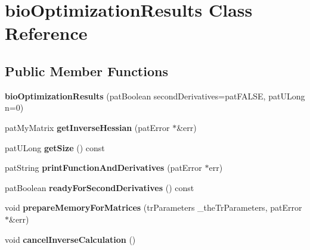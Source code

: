 \hypertarget{classbio_optimization_results}{}\section{bio\+Optimization\+Results Class Reference}
\label{classbio_optimization_results}
\subsection*{Public Member Functions}
\begin{DoxyCompactItemize}
\item 
\mbox{\label{classbio_optimization_results_a90e7bd279d0cfcef0f2ca31cb3e5d89e}} 
{\bfseries bio\+Optimization\+Results} (pat\+Boolean second\+Derivatives=pat\+F\+A\+L\+SE, pat\+U\+Long n=0)
\item 
\mbox{\label{classbio_optimization_results_a41c61212f6bbb12560997169923ed455}} 
pat\+My\+Matrix {\bfseries get\+Inverse\+Hessian} (pat\+Error $\ast$\&err)
\item 
\mbox{\label{classbio_optimization_results_a2b7aba815e2837f850462f5231dbec5c}} 
pat\+U\+Long {\bfseries get\+Size} () const
\item 
\mbox{\label{classbio_optimization_results_a9942cfce0ff2bcae23caaf1819ad2df5}} 
pat\+String {\bfseries print\+Function\+And\+Derivatives} (pat\+Error $\ast$err)
\item 
\mbox{\label{classbio_optimization_results_a13b1cf5dec67d1d8c8ae0944157a3d89}} 
pat\+Boolean {\bfseries ready\+For\+Second\+Derivatives} () const
\item 
\mbox{\label{classbio_optimization_results_af0f6e6019d935e3681cdc4b76a781d1d}} 
void {\bfseries prepare\+Memory\+For\+Matrices} (tr\+Parameters \+\_\+the\+Tr\+Parameters, pat\+Error $\ast$\&err)
\item 
\mbox{\label{classbio_optimization_results_af6074db88fc17044b9f32da700d3003d}} 
void {\bfseries cancel\+Inverse\+Calculation} ()
\item 

\end{DoxyCompactItemize}
